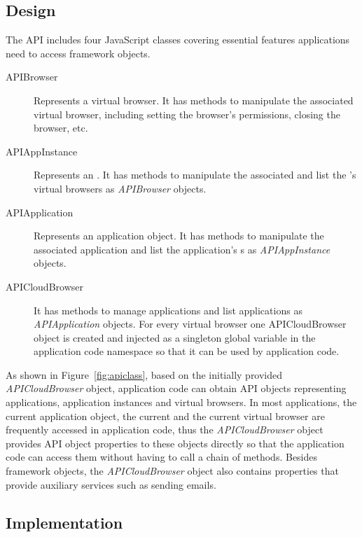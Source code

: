 \subsection{Design}

The \cb API includes four JavaScript classes covering essential features 
applications need to access framework objects.

\begin{description}

\item[APIBrowser] Represents a virtual browser.
It has methods to manipulate the associated virtual browser, including
setting the browser's permissions, closing the browser, etc.

\item[APIAppInstance] Represents an \appins{}. It has methods to manipulate
the associated \appins{} and list the \appins{}'s virtual browsers as 
\emph{APIBrowser} objects.

\item[APIApplication] Represents an application object.
It has methods to manipulate the associated application
and list the application's \appins{}s as \emph{APIAppInstance} objects.

\item[APICloudBrowser]
It has methods to manage applications and list applications as \emph{APIApplication} objects.
For every virtual browser one APICloudBrowser object is created and injected as
a singleton global variable in the application code namespace so that
it can be used by application code.

\end{description}

\apiclassfig{}

As shown in Figure~\ref{fig:apiclass}, based on the initially provided
\emph{APICloudBrowser} object, application code can obtain API objects 
representing applications, application instances and virtual browsers. 
In most applications, the
current application object, the current \appins{} and the current virtual browser are
frequently accessed in application code, thus
the \emph{APICloudBrowser} object provides API object properties to 
these objects directly so that  the application code can access them without 
having to call a chain of methods. Besides framework
objects, the \emph{APICloudBrowser} object also contains properties that
provide auxiliary services such as sending emails.

\subsection{Implementation}

